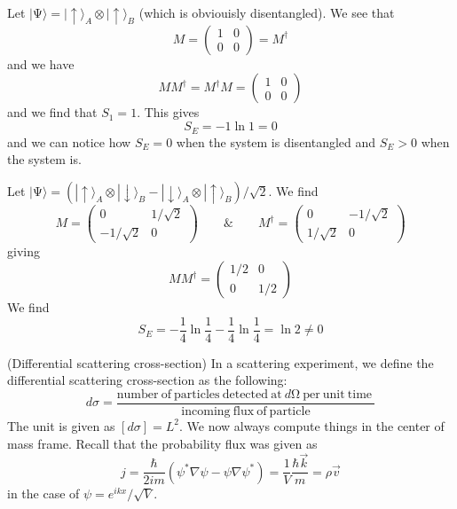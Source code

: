 \vspace{2ex}
\begin{ex}
Let $|\mathrm{\Psi} \rangle =|\uparrow\rangle _{A}\otimes |\uparrow\rangle _{B}$ (which is obviouisly disentangled). We see that
\[M=\begin{pmatrix}
1&0\\0&0
\end{pmatrix}=M^{\dagger }
\]
and we have 
\[MM^{\dagger }=M^{\dagger }M=\begin{pmatrix}
1&0\\0&0
\end{pmatrix}
\]
and we find that $S_1=1$. This gives
\[S_{E}=-1\ln 1=0\]
and we can notice how $S_{E}=0$ when the system is disentangled and $S_{E}>0$ when the system is.
\end{ex}
\vspace{2ex}
\begin{ex}
Let $|\mathrm{\Psi} \rangle= (|\uparrow\rangle _{A}\otimes |\downarrow\rangle _{B}-|\downarrow\rangle _{A}\otimes |\uparrow\rangle _{B})/\sqrt{2}$. We find
\[M=\begin{pmatrix}
0&1/\sqrt{2}\\-1/\sqrt{2}&0
\end{pmatrix}\qquad\&\qquad M^{\dagger }=\begin{pmatrix}
0&-1/\sqrt{2}\\1/\sqrt{2}&0
\end{pmatrix}
\]
giving
\[MM^{\dagger }=\begin{pmatrix}
1/2&0\\0&1/2
\end{pmatrix}
\]
We find
\[S_{E}=-\dfrac{1}{4}\ln \dfrac{1}{4}-\dfrac{1}{4}\ln \dfrac{1}{4}=\ln 2\ne 0\]
\end{ex}
\vspace{2ex}
\begin{defi}
(Differential scattering cross-section) In a scattering experiment, we define the differential scattering cross-section as the following:
\[d\sigma =\dfrac{\mathrm{number\ of\ particles\ detected\ at\ }d\mathrm{\Omega} \mathrm{\ per\ unit\ time\ }
}{\mathrm{incoming\ flux\ of\ particle}
}\]
The unit is given as $[d\sigma ]=L^2$. We now always compute things in the center of mass frame. Recall that the probability flux was given as
\[j=\dfrac{\hbar }{2im}(\psi ^{*}\nabla \psi -\psi \nabla \psi ^{*})=\dfrac{1}{V}\dfrac{\hbar \vec{k}}{m}=\rho \vec{v}\]
in the case of $\psi =e^{ikx}/\sqrt{V}$.
\end{defi}
\vspace{2ex}

